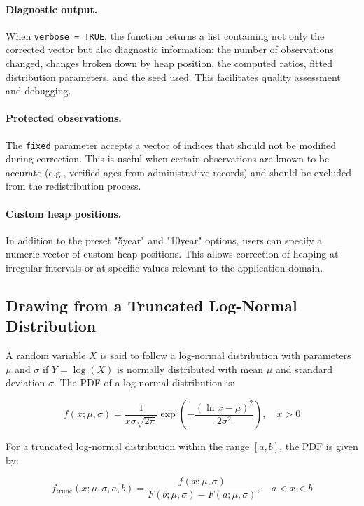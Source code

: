 \documentclass[pdflatex,sn-mathphys-num]{sn-jnl}%
\theoremstyle{thmstyleone}%
\theoremstyle{thmstyletwo}%
\theoremstyle{thmstylethree}%
\begin{document}
\paragraph{Diagnostic output.} When \texttt{verbose = TRUE}, the function returns a list containing not only the corrected vector but also diagnostic information: the number of observations changed, changes broken down by heap position, the computed ratios, fitted distribution parameters, and the seed used. This facilitates quality assessment and debugging.

\paragraph{Protected observations.} The \texttt{fixed} parameter accepts a vector of indices that should not be modified during correction. This is useful when certain observations are known to be accurate (e.g., verified ages from administrative records) and should be excluded from the redistribution process.

\paragraph{Custom heap positions.} In addition to the preset "5year" and "10year" options, users can specify a numeric vector of custom heap positions. This allows correction of heaping at irregular intervals or at specific values relevant to the application domain.



\subsection{Drawing from a Truncated Log-Normal Distribution}

A random variable \( X \) is said to follow a log-normal distribution with parameters \(\mu\) and \(\sigma\) if \( Y = \log(X) \) is normally distributed with mean \(\mu\) and standard deviation \(\sigma\). The PDF of a log-normal distribution is:

\[
f(x; \mu, \sigma) = \frac{1}{x \sigma \sqrt{2 \pi}} \exp\left( -\frac{(\ln x - \mu)^2}{2\sigma^2} \right), \quad x > 0
\]

For a truncated log-normal distribution within the range \([a, b]\), the PDF is given by:

\[
f_{\text{trunc}}(x; \mu, \sigma, a, b) = \frac{f(x; \mu, \sigma)}{F(b; \mu, \sigma) - F(a; \mu, \sigma)}, \quad a < x < b
\]
\end{document}
